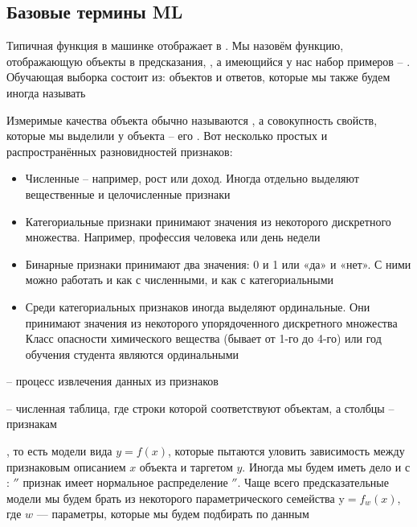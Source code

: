 \subsection{Базовые термины ML}

Типичная функция в машинке отображает  в .
Мы назовём функцию, отображающую объекты в предсказания, , а имеющийся у нас набор примеров --
.
Обучающая выборка состоит из: объектов и ответов, которые мы также будем иногда называть 

Измеримые качества объекта обычно называются , а совокупность свойств, которые мы выделили у
объекта – его .
Вот несколько простых и распространённых разновидностей признаков:

\begin{itemize}

    \item Численные – например, рост или доход.
    Иногда отдельно выделяют вещественные и целочисленные признаки

    \item Категориальные признаки принимают значения из некоторого дискретного множества.
    Например, профессия человека или день недели

    \item Бинарные признаки принимают два значения: 0 и 1 или «да» и «нет».
    С ними можно работать и как с численными, и как с категориальными

    \item Среди категориальных признаков иногда выделяют ординальные.
    Они принимают значения из некоторого упорядоченного дискретного множества
    Класс опасности химического вещества (бывает от 1-го до 4-го) или год обучения студента являются ординальными

\end{itemize}

 -- процесс извлечения данных из признаков

 -- численная таблица, где строки которой соответствуют объектам, а столбцы --
признакам

, то есть модели вида $y=f(x)$, которые пытаются уловить зависимость между
признаковым описанием $x$ объекта и таргетом $y$.
Иногда мы будем иметь дело и с : \(''\) признак имеет нормальное распределение \(''\).
Чаще всего предсказательные модели мы будем брать из некоторого параметрического семейства y$=f_w(x)$,
где $w$ — параметры, которые мы будем подбирать по данным

